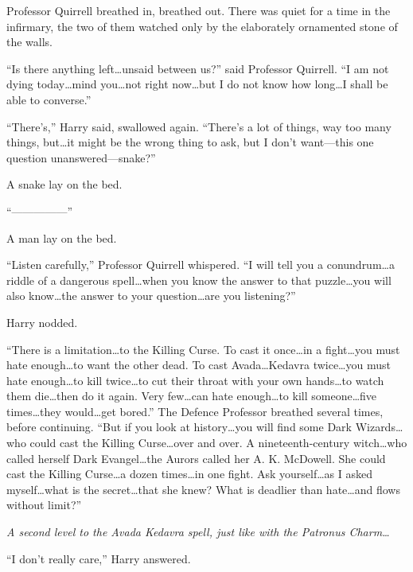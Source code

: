 Professor Quirrell breathed in, breathed out. There was quiet for a time in the infirmary, the two of them watched only by the elaborately ornamented stone of the walls.

“Is there anything left…unsaid between us?” said Professor Quirrell. “I am not dying today…mind you…not right now…but I do not know how long…I shall be able to converse.”

“There’s,” Harry said, swallowed again. “There’s a lot of things, way too many things, but…it might be the wrong thing to ask, but I don’t want—this one question unanswered—snake?”

A snake lay on the bed.

“—————”

A man lay on the bed.

“Listen carefully,” Professor Quirrell whispered. “I will tell you a conundrum…a riddle of a dangerous spell…when you know the answer to that puzzle…you will also know…the answer to your question…are you listening?”

Harry nodded.

“There is a limitation…to the Killing Curse. To cast it once…in a fight…you must hate enough…to want the other dead. To cast Avada…Kedavra twice…you must hate enough…to kill twice…to cut their throat with your own hands…to watch them die…then do it again. Very few…can hate enough…to kill someone…five times…they would…get bored.” The Defence Professor breathed several times, before continuing. “But if you look at history…you will find some Dark Wizards…who could cast the Killing Curse…over and over. A nineteenth-century witch…who called herself Dark Evangel…the Aurors called her A. K. McDowell. She could cast the Killing Curse…a dozen times…in one fight. Ask yourself…as I asked myself…what is the secret…that she knew? What is deadlier than hate…and flows without limit?”

\emph{A second level to the Avada Kedavra spell, just like with the Patronus Charm…}

“I don’t really care,” Harry answered.

